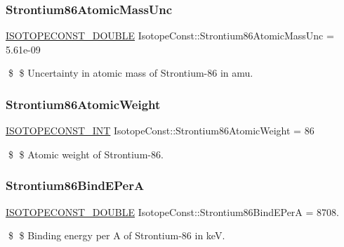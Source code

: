 \subsubsection{\texorpdfstring{Strontium86\+Atomic\+Mass\+Unc}{Strontium86AtomicMassUnc}}
{\footnotesize\ttfamily \mbox{\hyperlink{group___isotope_const-_macros_ga8f45a7272ce02c0b4c65c44636ed719a}{I\+S\+O\+T\+O\+P\+E\+C\+O\+N\+S\+T\+\_\+\+D\+O\+U\+B\+LE}} Isotope\+Const\+::\+Strontium86\+Atomic\+Mass\+Unc = 5.\+61e-\/09}

\$ \$ Uncertainty in atomic mass of Strontium-\/86 in amu. \mbox{\label{group___isotope_const-_strontium-_sr86_ga37c76897f7f0f5f640a81c13bfd253cc}} 
\subsubsection{\texorpdfstring{Strontium86\+Atomic\+Weight}{Strontium86AtomicWeight}}
{\footnotesize\ttfamily \mbox{\hyperlink{group___isotope_const-_macros_ga5f18360b3e99483a35c32d789e62621c}{I\+S\+O\+T\+O\+P\+E\+C\+O\+N\+S\+T\+\_\+\+I\+NT}} Isotope\+Const\+::\+Strontium86\+Atomic\+Weight = 86}

\$ \$ Atomic weight of Strontium-\/86. \mbox{\label{group___isotope_const-_strontium-_sr86_gaa897c5ebdc0b51b6ffcf833521b48148}} 
\subsubsection{\texorpdfstring{Strontium86\+Bind\+E\+PerA}{Strontium86BindEPerA}}
{\footnotesize\ttfamily \mbox{\hyperlink{group___isotope_const-_macros_ga8f45a7272ce02c0b4c65c44636ed719a}{I\+S\+O\+T\+O\+P\+E\+C\+O\+N\+S\+T\+\_\+\+D\+O\+U\+B\+LE}} Isotope\+Const\+::\+Strontium86\+Bind\+E\+PerA = 8708.}

\$ \$ Binding energy per A of Strontium-\/86 in keV. \mbox{\label{group___isotope_const-_strontium-_sr86_gac2d2960e9e6ebd839bae24fb350d0028}} 
